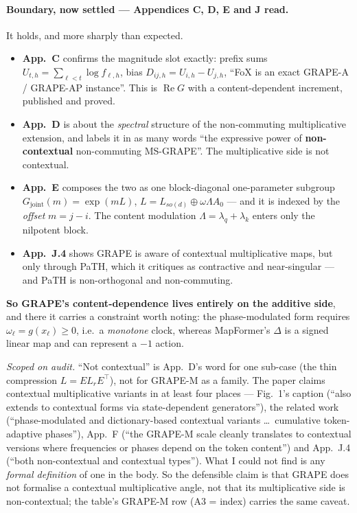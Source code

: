 \documentclass[11pt]{article}
\begin{document}
\paragraph{Boundary, now settled --- Appendices C, D, E and J read.} It holds,
and more sharply than expected.
\begin{itemize}\itemsep2pt
\item \textbf{App.~C} confirms the magnitude slot exactly: prefix sums
  $U_{t,h}=\sum_{\ell<t}\log f_{\ell,h}$, bias $D_{ij,h}=U_{i,h}-U_{j,h}$,
  ``FoX is an exact GRAPE-A / GRAPE-AP instance''. This is $\operatorname{Re}G$
  with a content-dependent increment, published and proved.
\item \textbf{App.~D} is about the \emph{spectral} structure of the non-commuting
  multiplicative extension, and labels it in as many words ``the expressive power
  of \textbf{non-contextual} non-commuting MS-GRAPE''. The multiplicative side is
  not contextual.
\item \textbf{App.~E} composes the two as one block-diagonal one-parameter
  subgroup $G_{\mathrm{joint}}(m)=\exp(mL)$, $L = L_{so(d)} \oplus \omega\Lambda
  A_0$ --- and it is indexed by the \emph{offset} $m=j-i$. The content modulation
  $\Lambda=\lambda_q+\lambda_k$ enters only the nilpotent block.
\item \textbf{App.~J.4} shows GRAPE is aware of contextual multiplicative maps,
  but only through PaTH, which it critiques as contractive and near-singular ---
  and PaTH is non-orthogonal and non-commuting.
\end{itemize}

\noindent \textbf{So GRAPE's content-dependence lives entirely on the additive
side}, and there it carries a constraint worth noting: the phase-modulated form
requires $\omega_\ell = g(x_\ell) \ge 0$, i.e.\ a \emph{monotone} clock, whereas
MapFormer's $\Delta$ is a signed linear map and can represent a $-1$ action.

\emph{Scoped on audit.} ``Not contextual'' is App.~D's word for one sub-case (the
thin compression $L = EL_rE^\top$), not for GRAPE-M as a family. The paper claims
contextual multiplicative variants in at least four places --- Fig.~1's caption
(``also extends to contextual forms via state-dependent generators''), the related
work (``phase-modulated and dictionary-based contextual variants \dots\ cumulative
token-adaptive phases''), App.~F (``the GRAPE-M scale cleanly translates to
contextual versions where frequencies or phases depend on the token content'') and
App.~J.4 (``both non-contextual and contextual types''). What I could not find is
any \emph{formal definition} of one in the body. So the defensible claim is that
GRAPE does not formalise a contextual multiplicative angle, not that its
multiplicative side is non-contextual; the table's GRAPE-M row (A3 = index) carries
the same caveat.
\end{document}
